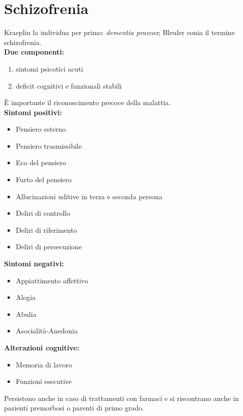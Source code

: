 \documentclass[12pt, a4paper]{article}
\begin{document}
\section{Schizofrenia}

Kraeplin la individua per primo: \emph{dementia praecox};
Bleuler conia il termine schizofrenia.
\medskip\\  
\textbf{Due componenti:} 
\begin{enumerate}
    \item sintomi psicotici acuti  
    \item deficit cognitivi e funzionali stabili
\end{enumerate}
È importante il riconoscimento precoce della malattia.
\medskip\\   
\textbf{Sintomi positivi:}
\begin{itemize}
    \item Pensiero esterno
    \item Pensiero trasmissibile    
    \item Eco del pensiero  
    \item Furto del pensiero
    \item Allucinazioni uditive in terza e seconda persona
    \item Deliri di controllo
    \item Deliri di riferimento
    \item Deliri di persecuzione
\end{itemize}
\medskip 
\textbf{Sintomi negativi:}
\begin{itemize}
    \item Appiattimento affettivo
    \item Alogia
    \item Abulia
    \item Asocialità-Anedonia
\end{itemize}
\medskip
\textbf{Alterazioni cognitive:}
\begin{itemize}
    \item Memoria di lavoro
    \item Funzioni esecutive
\end{itemize}
Persistono anche in caso di trattamenti con farmaci e si riscontrano anche in pazienti premorbosi o parenti di  primo grado.
\end{document}
